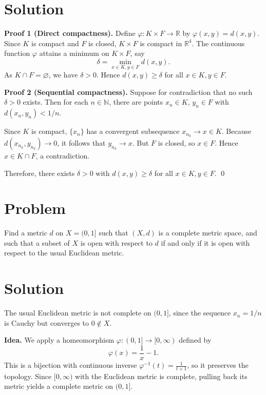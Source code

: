 \documentclass[11pt,a4paper]{article}
\theoremstyle{definition}
\theoremstyle{definition}
\theoremstyle{plain}
\theoremstyle{remark}
\begin{document}
\section*{Solution}

\textbf{Proof 1 (Direct compactness).}  
Define $\varphi : K \times F \to \mathbb{R}$ by $\varphi(x,y) = d(x,y)$.  
Since $K$ is compact and $F$ is closed, $K \times F$ is compact in $\mathbb{R}^4$.  
The continuous function $\varphi$ attains a minimum on $K \times F$, say
\[
\delta = \min_{x \in K, y \in F} d(x,y).
\]
As $K \cap F = \varnothing$, we have $\delta > 0$. Hence $d(x,y) \geq \delta$ for all $x \in K, y \in F$.

\medskip

\textbf{Proof 2 (Sequential compactness).}  
Suppose for contradiction that no such $\delta > 0$ exists. Then for each $n \in \mathbb{N}$, there are points $x_n \in K$, $y_n \in F$ with $d(x_n,y_n) < 1/n$.  

Since $K$ is compact, $\{x_n\}$ has a convergent subsequence $x_{n_k} \to x \in K$.  
Because $d(x_{n_k},y_{n_k}) \to 0$, it follows that $y_{n_k} \to x$.  
But $F$ is closed, so $x \in F$. Hence $x \in K \cap F$, a contradiction.  

Therefore, there exists $\delta > 0$ with $d(x,y) \geq \delta$ for all $x \in K, y \in F$. \qed

\section*{Problem}
Find a metric $d$ on $X = (0,1]$ such that $(X,d)$ is a complete metric space, and such that a subset of $X$ is open with respect to $d$ if and only if it is open with respect to the usual Euclidean metric.

\section*{Solution}
The usual Euclidean metric is not complete on $(0,1]$, since the sequence $x_n = 1/n$ is Cauchy but converges to $0 \notin X$.

\medskip

\textbf{Idea.}  
We apply a homeomorphism $\varphi:(0,1]\to [0,\infty)$ defined by
\[
\varphi(x) = \frac{1}{x} - 1.
\]
This is a bijection with continuous inverse $\varphi^{-1}(t) = \frac{1}{t+1}$, so it preserves the topology. Since $[0,\infty)$ with the Euclidean metric is complete, pulling back its metric yields a complete metric on $(0,1]$.
\end{document}
